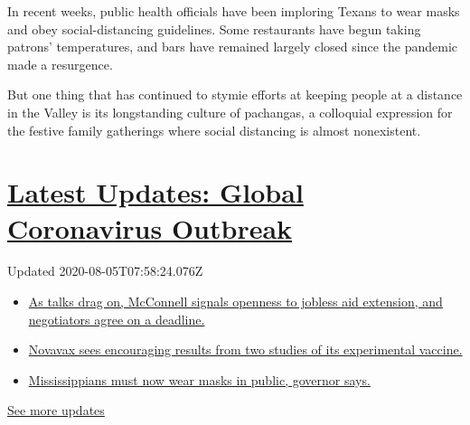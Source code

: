 In recent weeks, public health officials have been imploring Texans to
wear masks and obey social-distancing guidelines. Some restaurants have
begun taking patrons' temperatures, and bars have remained largely
closed since the pandemic made a resurgence.

But one thing that has continued to stymie efforts at keeping people at
a distance in the Valley is its longstanding culture of pachangas, a
colloquial expression for the festive family gatherings where social
distancing is almost nonexistent.

\hypertarget{latest-updates-global-coronavirus-outbreak}{%
\section{\texorpdfstring{\href{https://www.nytimes3xbfgragh.onion/2020/08/04/world/coronavirus-cases.html?action=click\&pgtype=Article\&state=default\&region=MAIN_CONTENT_1\&context=storylines_live_updates}{Latest
Updates: Global Coronavirus
Outbreak}}{Latest Updates: Global Coronavirus Outbreak}}\label{latest-updates-global-coronavirus-outbreak}}

Updated 2020-08-05T07:58:24.076Z

\begin{itemize}
\tightlist
\item
  \href{https://www.nytimes3xbfgragh.onion/2020/08/04/world/coronavirus-cases.html?action=click\&pgtype=Article\&state=default\&region=MAIN_CONTENT_1\&context=storylines_live_updates\#link-762df92}{As
  talks drag on, McConnell signals openness to jobless aid extension,
  and negotiators agree on a deadline.}
\item
  \href{https://www.nytimes3xbfgragh.onion/2020/08/04/world/coronavirus-cases.html?action=click\&pgtype=Article\&state=default\&region=MAIN_CONTENT_1\&context=storylines_live_updates\#link-1228a480}{Novavax
  sees encouraging results from two studies of its experimental
  vaccine.}
\item
  \href{https://www.nytimes3xbfgragh.onion/2020/08/04/world/coronavirus-cases.html?action=click\&pgtype=Article\&state=default\&region=MAIN_CONTENT_1\&context=storylines_live_updates\#link-794484ed}{Mississippians
  must now wear masks in public, governor says.}
\end{itemize}

\href{https://www.nytimes3xbfgragh.onion/2020/08/04/world/coronavirus-cases.html?action=click\&pgtype=Article\&state=default\&region=MAIN_CONTENT_1\&context=storylines_live_updates}{See
more updates}

